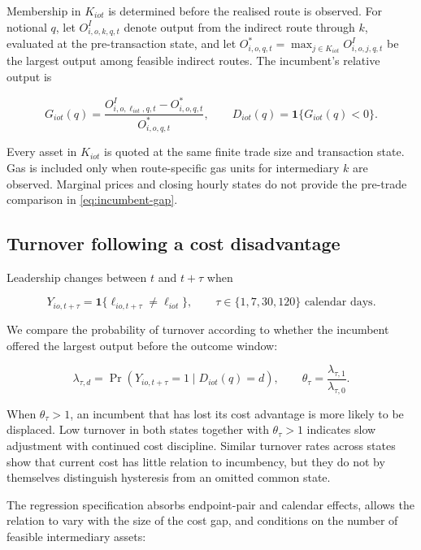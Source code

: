 Membership in $K_{iot}$ is determined before the realised route is observed. For notional $q$, let $O^{I}_{i,o,k,q,t}$ denote output from the indirect route through $k$, evaluated at the pre-transaction state, and let $O^{*}_{i,o,q,t}=\max_{j\in K_{iot}}O^{I}_{i,o,j,q,t}$ be the largest output among feasible indirect routes. The incumbent's relative output is

\begin{equation}
G_{iot}(q)=\frac{O^{I}_{i,o,\ell_{iot},q,t}-O^{*}_{i,o,q,t}}{O^{*}_{i,o,q,t}},
\qquad D_{iot}(q)=\mathbf{1}\{G_{iot}(q)<0\}.
\label{eq:incumbent-gap}
\end{equation}

Every asset in $K_{iot}$ is quoted at the same finite trade size and transaction state. Gas is included only when route-specific gas units for intermediary $k$ are observed. Marginal prices and closing hourly states do not provide the pre-trade comparison in \eqref{eq:incumbent-gap}.

\subsection{Turnover following a cost disadvantage}
\label{sec:survival:hazard}

Leadership changes between $t$ and $t+\tau$ when

\begin{equation}
Y_{io,t+\tau}=\mathbf{1}\{\ell_{io,t+\tau}\neq\ell_{iot}\},
\qquad \tau\in\{1,7,30,120\}\text{ calendar days}.
\label{eq:event}
\end{equation}

We compare the probability of turnover according to whether the incumbent offered the largest output before the outcome window:

\begin{equation}
\lambda_{\tau,d}=\Pr\!\left(Y_{io,t+\tau}=1\mid D_{iot}(q)=d\right),
\qquad \theta_{\tau}=\frac{\lambda_{\tau,1}}{\lambda_{\tau,0}}.
\label{eq:hazard}
\end{equation}

When $\theta_{\tau}>1$, an incumbent that has lost its cost advantage is more likely to be displaced. Low turnover in both states together with $\theta_{\tau}>1$ indicates slow adjustment with continued cost discipline. Similar turnover rates across states show that current cost has little relation to incumbency, but they do not by themselves distinguish hysteresis from an omitted common state.

The regression specification absorbs endpoint-pair and calendar effects, allows the relation to vary with the size of the cost gap, and conditions on the number of feasible intermediary assets:

